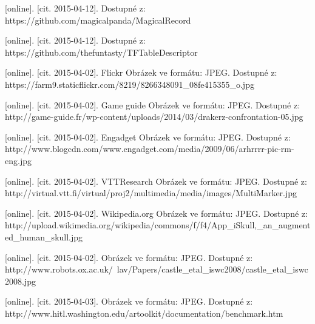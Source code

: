 \documentclass[twoside,12pt]{article}
\begin{document}
\begin{literatura}
{
	[online]. [cit. 2015-04-12]. Dostupné z: https://github.com/magicalpanda/MagicalRecord
}

{
	[online]. [cit. 2015-04-12]. Dostupné z: https://github.com/thefuntasty/TFTableDescriptor
}



{
	[online]. [cit. 2015-04-02]. Flickr
	Obrázek ve formátu: JPEG. Dostupné z: https://farm9.staticflickr.com/8219/8266348091\_08fe415355\_o.jpg
}

{
	[online]. [cit. 2015-04-02]. Game guide
	Obrázek ve formátu: JPEG. Dostupné z: http://game-guide.fr/wp-content/uploads/2014/03/drakerz-confrontation-05.jpg
}

{
	[online]. [cit. 2015-04-02]. Engadget
	Obrázek ve formátu: JPEG. Dostupné z: http://www.blogcdn.com/www.engadget.com/media/2009/06/arhrrrr-pic-rm-eng.jpg
}

{
	[online]. [cit. 2015-04-02]. VTTResearch
	Obrázek ve formátu: JPEG. Dostupné z: http://virtual.vtt.fi/virtual/proj2/multimedia/media/images/MultiMarker.jpg
}

{
	[online]. [cit. 2015-04-02]. Wikipedia.org
	Obrázek ve formátu: JPEG. Dostupné z: http://upload.wikimedia.org/wikipedia/commons/f/f4/App\_iSkull,\_an\_augmented\_human\_skull.jpg
}

{
	[online]. [cit. 2015-04-02]. 
	Obrázek ve formátu: JPEG. Dostupné z: http://www.robots.ox.ac.uk/~lav/Papers/castle\_etal\_iswc2008/castle\_etal\_iswc2008.jpg
}

{
	[online]. [cit. 2015-04-03]. 
	Obrázek ve formátu: JPEG. Dostupné z: http://www.hitl.washington.edu/artoolkit/documentation/benchmark.htm
}


\end{literatura}
\end{document}
